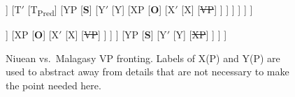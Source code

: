 \documentclass[output=paper,colorlinks,citecolor=brown,
]{langscibook}
\begin{document}
\begin{figure}
    \centering
\begin{forest}
[TP 
	[VP\textsubscript{Pred},tikz={\node [draw,inner sep=0,fit to=tree]{};}
		[\textbf{V}]
		[\sout{O}] 
	]
	[T$'$
		[T\textsubscript{Pred}]  
		[YP [\textbf{S}] 
			[Y$'$ 
				[Y] 
				[XP 
					[\textbf{O}]
					[X$'$  
						[X] 
						[\sout{VP}] 
					]
				]
			]
		]
	]
]
\end{forest}\hfill
\begin{forest}
[YP,s sep=1cm
	[XP,tikz={\node [draw,inner sep=0pt,fit to=tree]{};} 
		[VP,tikz={\node [draw,inner sep=-2pt,fit to=tree]{};}
			[\textbf{V}]
			[\sout{O}]
		]	 
		[XP 
			[\textbf{O}]
			[X$'$  
				[X] 
				[\sout{VP}]
			]
		]
	] 
	[YP 
		[\textbf{S}]
		[Y$'$ 
			[Y] 
			[\sout{XP}]
		]
	]
]
\end{forest}
    \label{ex:NvsM}
    \label{ex:NvsMtrees}
    \caption[Niuean vs.\ Malagasy VP fronting]{Niuean vs.\ Malagasy VP fronting. Labels of X(P) and Y(P) are used to abstract away from details that are not necessary to make the point needed here.}
\end{figure}
  
\end{document}
